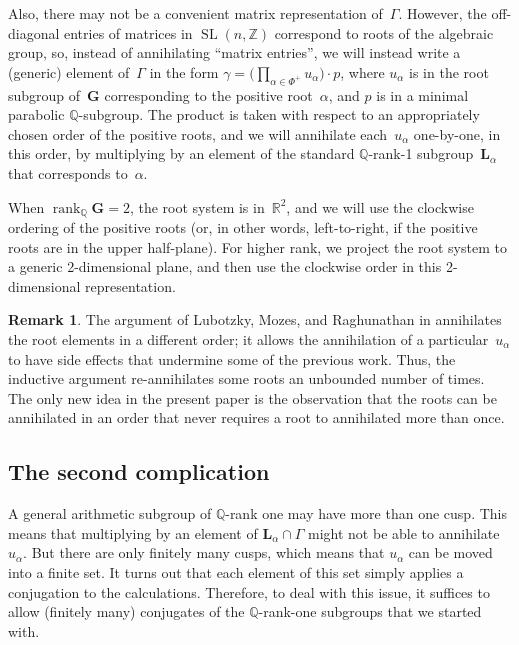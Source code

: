 \documentclass[11pt]{article}
\numberwithin{equation}{section}
\newcommand{\QQ}{\mathbb{Q}}
\newcommand{\RR}{\mathbb{R}}
\newcommand{\ZZ}{\mathbb{Z}}
\newcommand{\Ga}{\mathbf{G}}
\newcommand{\La}{\mathbf{L}}
\DeclareMathOperator{\rank}{rank}
\DeclareMathOperator{\SL}{SL}
\numberwithin{equation}{section}
\theoremstyle{definition}
\newtheorem{rem}[thm]{Remark}
\begin{document}
Also, there may not be a convenient matrix representation of~$\Gamma$. However, the off-diagonal entries of matrices in $\SL(n,\ZZ)$ correspond to roots of the algebraic group, so, instead of annihi\-la\-ting ``matrix entries'', we will instead write a (generic) element of~$\Gamma$ in the form $\gamma = \bigl(\prod\limits_{\alpha\in \Phi^+} u_\alpha \bigr) \cdot p$, where $u_\alpha$ is in the root subgroup of~$\Ga$ corresponding to the positive root~$\alpha$, and $p$ is in a minimal parabolic $\QQ$-subgroup.
The product is taken with respect to an appropriately chosen order of the positive roots, and we will annihilate each~$u_\alpha$ one-by-one, in this order, by multiplying by an element of the standard $\QQ$-rank-1 subgroup~$\La_\alpha$ that corresponds to~$\alpha$.

When $\rank_\QQ \Ga = 2$, the root system is in~$\RR^2$, and we will use the clockwise ordering of the positive roots (or, in other words, left-to-right, if the positive roots are in the upper half-plane). For higher rank, we project the root system to a generic 2-dimensional plane, and then use the clockwise order in this 2-dimensional representation.

\begin{rem} The argument of Lubotzky, Mozes, and Raghunathan in \cite[Section~4]{MR1828742} annihilates the root elements in a different order; it allows the annihilation of a particular~$u_\alpha$ to have side effects that undermine some of the previous work. Thus, the inductive argument re-annihilates some roots an unbounded number of times. The only new idea in the present paper is the observation that the roots can be annihilated in an order that never requires a root to annihilated more than once.
\end{rem}

\subsection*{The second complication}
 A general arithmetic subgroup of $\QQ$-rank one may have more than one cusp. This means that multiplying by an element of $\La_\alpha \cap \Gamma$ might not be able to annihilate $u_\alpha$. But there are only finitely many cusps, which means that $u_\alpha$ can be moved into a finite set. It turns out that each element of this set simply applies a conjugation to the calculations. Therefore, to deal with this issue, it suffices to allow (finitely many) conjugates of the $\QQ$-rank-one subgroups that we started with.
\end{document}
